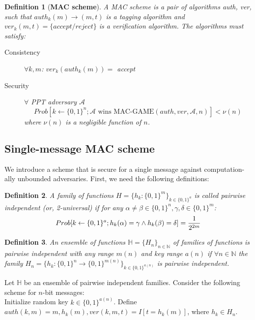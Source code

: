 \documentclass[12pt]{article}
\newcommand{\adv}{\mathcal{A}}
\newcommand{\pr}{Prob}
\newtheorem{definition}{Definition}[section]
\begin{document}
\begin{definition}[\textbf{MAC scheme}]
A MAC scheme is a pair of algorithms \textit{auth}, \textit{ver}, such that $auth_k(m) \rightarrow (m, t)$ is a tagging algorithm and $ver_k(m, t) = \{accept/reject\}$ is a verification algorithm. The algorithms must satisfy:
\begin{description}
\item[Consistency] $\forall k,m$: $ver_k(auth_k(m))=$ accept
\item[Security] $\forall$ PPT adversary $\adv$
\[ \pr[k \leftarrow \{0,1\}^n; \adv \text{ wins MAC-GAME}(auth,ver,\adv,n)] < \nu(n)\]
where $\nu(n)$ is a negligible function of $n$.
\end{description}
\end{definition}

\subsection*{Single-message MAC scheme}
We introduce a scheme that is secure for a single message against computation-
ally unbounded adversaries. First, we need the following definitions:
\begin{definition}
A family of functions $H = \{h_k : \{0, 1\}^m\}_{k \in \{0,1\}^a}$ is called \textit{pairwise independent} (or, \textit{2-universal}) if for any $ \alpha \neq \beta \in\{0,1\}^n, \gamma, \delta \in \{0, 1\}^m$:
\[ \pr[ k \leftarrow \{0,1\}^a; h_k(\alpha) = \gamma \wedge h_k(\beta) = \delta] = { 1 \over 2^{2m}}\]
\end{definition}

\begin{definition}
An ensemble of functions $\mathbb{H} = \{H_n\}_{n\in \mathbb{N}}$ of families of functions is \textit{pairwise independent} with any range $m(n)$ and key range $a(n)$ if $\forall n \in \mathbb{N}$ the family $H_n = \{h_k : \{0,1\}^n \rightarrow \{0,1\}^{m(n)}\}_{k \in \{0,1\}^{a(n)}}$ is pairwise independent.
\end{definition}

Let $\mathbb{H}$ be an ensemble of pairwise independent families. Consider the following scheme for $n$-bit messages:\\
Initialize random key $k \in \{0, 1\}^{a(n)}$. Define $auth(k,m) = m, h_k(m), ver(k, m, t) = I[t=h_k(m)]$, where $h_k \in H_n$.
\end{document}
